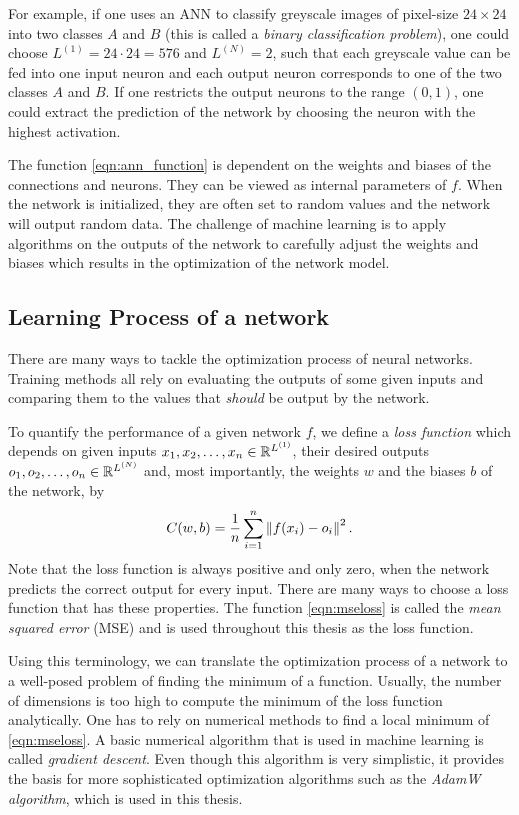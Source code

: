 For example, if one uses an ANN to classify greyscale images of pixel-size $24\times 24$ into two classes $A$ and $B$ (this is called a \textit{binary classification problem}), one could choose $L^{(1)} = 24 \cdot 24 = 576$ and $L^{(N)} = 2$, such that each greyscale value can be fed into one input neuron and each output neuron corresponds to one of the two classes $A$ and $B$. If one restricts the output neurons to the range $(0, 1)$, one could extract the prediction of the network by choosing the neuron with the highest activation.

The function \eqref{eqn:ann_function} is dependent on the weights and biases of the connections and neurons. They can be viewed as internal parameters of $f$. When the network is initialized, they are often set to random values and the network will output random data. The challenge of machine learning is to apply algorithms on the outputs of the network to carefully adjust the weights and biases which results in the optimization of the network model.

\subsection{Learning Process of a network}
\label{sec:sgd}
There are many ways to tackle the optimization process of neural networks. Training methods all rely on evaluating the outputs of some given inputs and comparing them to the values that \textit{should} be output by the network.

To quantify the performance of a given network $f$, we define a \textit{loss function} which depends on given inputs $x_1, x_2, \dots, x_n \in \mathbb{R}^{L^{(1)}}$, their desired outputs $o_1, o_2, \dots, o_n \in \mathbb{R}^{L^{(N)}}$ and, most importantly, the weights $w$ and the biases $b$ of the network, by
\begin{equation}
  \label{eqn:mseloss}
  C(w, b) = \frac{1}{n}\sum_{i=1}^{n}\left\lVert f(x_i)-o_i\right\rVert^2.
\end{equation}
Note that the loss function is always positive and only zero, when the network predicts the correct output for every input. There are many ways to choose a loss function that has these properties. The function \eqref{eqn:mseloss} is called the \textit{mean squared error} (MSE) and is used throughout this thesis as the loss function.

Using this terminology, we can translate the optimization process of a network to a well-posed problem of finding the minimum of a function. Usually, the number of dimensions is too high to compute the minimum of the loss function analytically. One has to rely on numerical methods to find a local minimum of \eqref{eqn:mseloss}. A basic numerical algorithm that is used in machine learning is called \textit{gradient descent}. Even though this algorithm is very simplistic, it provides the basis for more sophisticated optimization algorithms such as the \textit{AdamW algorithm}, which is used in this thesis.

